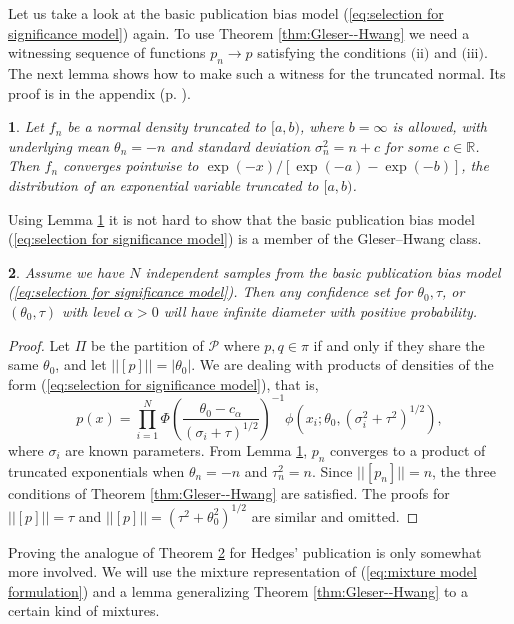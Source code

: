 \documentclass[article]{ajs}
\numberwithin{equation}{section}
\numberwithin{figure}{section}
\theoremstyle{plain}
\newtheorem{thm}{\protect\theoremname}
\theoremstyle{definition}
\theoremstyle{definition}
\theoremstyle{plain}
\newtheorem{lem}[thm]{\protect\lemmaname}
\providecommand{\lemmaname}{Lemma}
\providecommand{\theoremname}{Theorem}
\renewcommand{\sqrt}[1]{{(#1)^{1/2}}}
\begin{document}
Let us take a look at the basic publication bias model (\ref{eq:selection for significance model})
again. To use Theorem \ref{thm:Gleser--Hwang} we need a witnessing
sequence of functions $p_{n}\to p$ satisfying the conditions $\text{(ii)}$
and $\text{(iii)}$. The next lemma shows how to make such a witness
for the truncated normal. Its proof is in the appendix (p. \pageref{proof:generalized shifted exponential}).
\begin{lem}
\label{lem:generalized shifted exponential} Let $f_{n}$ be a normal
density truncated to $[a,b)$, where $b=\infty$ is allowed, with
underlying mean $\theta_{n}=-n$ and standard deviation $\sigma_{n}^{2}=n+c$
for some $c\in\mathbb{R}$. Then $f_{n}$ converges pointwise to $\exp(-x)/[\exp(-a)-\exp(-b)]$,
the distribution of an exponential variable truncated to $[a,b)$.
\end{lem}

Using Lemma \ref{lem:generalized shifted exponential} it is not hard
to show that the basic publication bias model (\ref{eq:selection for significance model})
is a member of the Gleser--Hwang class.
\begin{thm}
\label{thm:simple publication bias} Assume we have $N$ independent samples
from the basic publication bias model (\ref{eq:selection for significance model}). Then any confidence set for $\theta_{0},\tau$, or
$(\theta_{0},\tau)$ with level $\alpha>0$ will have infinite diameter
with positive probability. 
\end{thm}

\begin{proof}
\label{proof:simple publication bias}Let $\Pi$ be the partition
of $\mathcal{P}$ where $p,q\in\pi$ if and only if they share the
same $\theta_{0}$, and let $||[p]||=|\theta_{0}|$. We are dealing
with products of densities of the form (\ref{eq:selection for significance model}),
that is,
\[
p(x)=\prod_{i=1}^{N}\Phi\left(\frac{\theta_{0}-c_{\alpha}}{\sqrt{\sigma_{i}+\tau}}\right)^{-1}\phi(x_{i};\theta_{0},\sqrt{\sigma_{i}^{2}+\tau^{2}}),
\]
where $\sigma_{i}$ are known parameters. From Lemma \ref{lem:generalized shifted exponential},
$p_{n}$ converges to a product of truncated exponentials when $\theta_{n}=-n$
and $\tau_{n}^{2}=n$. Since $||[p_{n}]||=n$, the three conditions
of Theorem \ref{thm:Gleser--Hwang} are satisfied. The proofs for
$||[p]||=\tau$ and $||[p]||=\sqrt{\tau^{2}+\theta_{0}^{2}}$ are
similar and omitted.
\end{proof}
Proving the analogue of Theorem \ref{thm:simple publication bias}
for Hedges' publication is only somewhat more involved. We will use
the mixture representation of (\ref{eq:mixture model formulation})
and a lemma generalizing Theorem \ref{thm:Gleser--Hwang} to a certain
kind of mixtures. 
\end{document}
